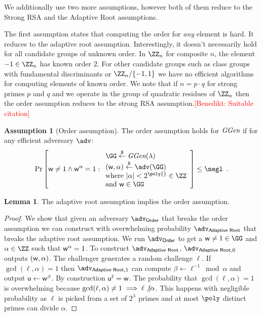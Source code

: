 \documentclass{article}
\theoremstyle{definition}
\newtheorem{lemma}{Lemma}
\newtheorem{assumption}{Assumption}
\newcommand{\benedikt}[1]{{\textcolor{red}{[Benedikt: #1]}}}
\newcommand{\benedikt}[1]{}
\begin{document}
We additionally use two more assumptions, however both of them reduce to the Strong RSA and the Adaptive Root assumptions.

The first assumption states that computing the order for \emph{any} element is hard. It reduces to the adaptive root assumption. Interestingly, it doesn't necessarily hold for all candidate groups of unknown order. In $\ZZ_n$ for composite $n$, the element $-1\in \ZZ_n$ has known order $2$. For other candidate groups such as class groups with fundamental discriminants or $\ZZ_n/\{-1,1\}$ we have no efficient algorithms for computing elements of known order. We note that if $n=p\cdot q$ for strong primes $p$ and $q$ and we operate in the group of quadratic residues of $\ZZ_n$ then the order assumption reduces to the strong RSA assumption.\benedikt{Suitable citation}
\begin{assumption}[Order assumption]
\label{assum:order}
	The order assumption holds for $\textit{GGen}$ if for any efficient adversary $\adv$:
\[        
                \Pr\left[\gr{w}\neq 1 \wedge \gr{w}^{\alpha}= 1: 
                \begin{array}{l} 
                      \GG \sample \ggen(\lambda) \\ 
                      (\gr{w},\alpha) \sample \adv(\GG) \\
                      \text{where } |\alpha|<2^{\poly{}}\in \ZZ\\
                      \text{and } \gr{w}\in \GG
                \end{array} 
        \right] \leq \negl \enspace .
\]
\end{assumption}
\begin{lemma}
\label{lem:ordertoadaptive}
	The adaptive root assumption implies the order assumption.
\end{lemma}
\begin{proof}
	We show that given an adversary $\adv_{\textsf{Order}}$ that breaks the order assumption we can construct with overwhelming probability $\adv_{\textsf{Adaptive Root}}$ that breaks the adaptive root assumption. We run $\adv_{\textsf{Order}}$ to get a $\gr{w}\neq 1\in \GG$ and $\alpha \in \ZZ$ such that $\mathsf{w}^{\alpha}=1$. To construct $\adv_{\textsf{Adaptive Root}}$, $\adv_{\textsf{Adaptive Root},0}$ outputs $(\mathsf{w},\alpha)$. The challenger generates a random challenge $\ell$. If $\gcd(\ell,\alpha)=1$ then $\adv_{\textsf{Adaptive Root},1}$ can compute $\beta\gets \ell^{-1} \bmod \alpha$ and output $\mathsf{u}\gets\mathsf{w}^{\beta}$. By construction $\mathsf{u}^{\ell}=\mathsf{w}$. The probability that $\gcd(\ell,\alpha)=1$ is overwhelming because $\gcd(\ell,\alpha)\neq 1 \implies \ell \not\vert \alpha$. This happens with negligible probability as $\ell$ is picked from a set of $2^\lambda$ primes and at most $\poly$ distinct primes can divide $\alpha$.
	\end{proof}
	
\end{document}
